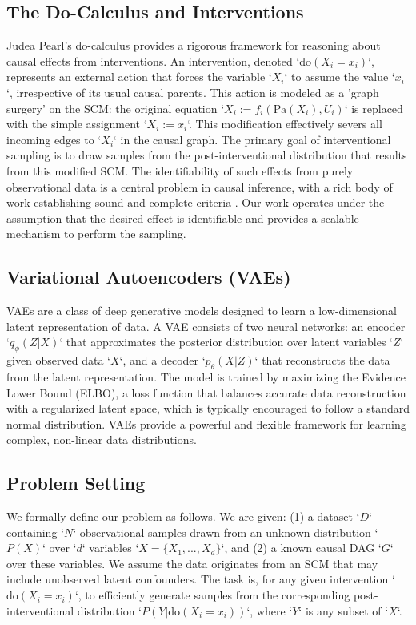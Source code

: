 \documentclass{article} %
\begin{document}
\subsection{The Do-Calculus and Interventions}
Judea Pearl's do-calculus provides a rigorous framework for reasoning about causal effects from interventions. An intervention, denoted `$\mathrm{do}(X_i = x_i)$`, represents an external action that forces the variable `$X_i$` to assume the value `$x_i$`, irrespective of its usual causal parents. This action is modeled as a 'graph surgery' on the SCM: the original equation `$X_i := f_i(\mathrm{Pa}(X_i), U_i)$` is replaced with the simple assignment `$X_i := x_i$`. This modification effectively severs all incoming edges to `$X_i$` in the causal graph. The primary goal of interventional sampling is to draw samples from the post-interventional distribution that results from this modified SCM. The identifiability of such effects from purely observational data is a central problem in causal inference, with a rich body of work establishing sound and complete criteria \cite{huang_2012_pearl, shpitser_2023_when, kivva_2022_revisiting}. Our work operates under the assumption that the desired effect is identifiable and provides a scalable mechanism to perform the sampling.

\subsection{Variational Autoencoders (VAEs)}
VAEs are a class of deep generative models designed to learn a low-dimensional latent representation of data. A VAE consists of two neural networks: an encoder `$q_\phi(Z|X)$` that approximates the posterior distribution over latent variables `$Z$` given observed data `$X$`, and a decoder `$p_\theta(X|Z)$` that reconstructs the data from the latent representation. The model is trained by maximizing the Evidence Lower Bound (ELBO), a loss function that balances accurate data reconstruction with a regularized latent space, which is typically encouraged to follow a standard normal distribution. VAEs provide a powerful and flexible framework for learning complex, non-linear data distributions.

\subsection{Problem Setting}
We formally define our problem as follows. We are given: (1) a dataset `$D$` containing `$N$` observational samples drawn from an unknown distribution `$P(X)$` over `$d$` variables `$X = \{X_1, ..., X_d\}$`, and (2) a known causal DAG `$G$` over these variables. We assume the data originates from an SCM that may include unobserved latent confounders. The task is, for any given intervention `$\mathrm{do}(X_i = x_i)$`, to efficiently generate samples from the corresponding post-interventional distribution `$P(Y | \mathrm{do}(X_i = x_i))$`, where `$Y$` is any subset of `$X$`. 
\end{document}
